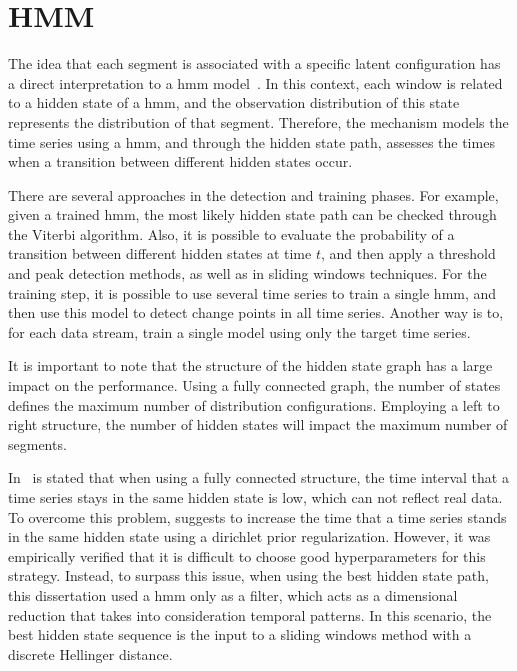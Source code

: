 \section{HMM}

The idea that each segment is associated with a specific latent configuration
has a direct interpretation to a \gls*{hmm}
model~\cite{a_hidden_markov_model_segmentation_procedure_for_hydrological_and_environmental_time_series, fast_estimation_of_posterior_probabilities_in_change-point_analysis_through_a_constrained_hidden_markov_model, inertial_hidden_markov_models_modeling_change_in_multivariate_time_series}.
In this context, each window is related to a hidden state of a \gls*{hmm}, and the
observation distribution of this state represents the distribution of that
segment. Therefore, the mechanism models the time series using a \gls*{hmm}, and
through the hidden state path, assesses the times when a transition between
different hidden states occur.

There are several approaches in the detection and training phases. For example,
given a trained \gls*{hmm}, the most likely hidden state path can be checked
through
the Viterbi algorithm. Also, it is possible to evaluate the probability of a
transition between different hidden states at time $t$, and then apply a
threshold and peak detection methods, as well as in sliding windows techniques.
For the training step, it is possible to use several time series to train a
single \gls*{hmm}, and then use this model to detect change points in all time series.
Another way is to, for each data stream, train a single model using only the
target time series.

It is important to note that the structure of the hidden state graph has a large
impact on the performance. Using a fully connected graph, the number of states
defines the maximum number of distribution configurations. Employing a left to
right structure, the number of hidden states will impact the maximum number of
segments.

In~\cite{inertial_hidden_markov_models_modeling_change_in_multivariate_time_series}
is stated that when using a fully connected structure, the time interval that a
time series stays in the same hidden state is low, which can not reflect real
data. To overcome this problem,
\cite{inertial_hidden_markov_models_modeling_change_in_multivariate_time_series}
suggests to increase the time that a time series stands in the same hidden
state using a dirichlet prior regularization. However, it was empirically
verified that it is difficult to choose good hyperparameters for this strategy.
Instead, to surpass this issue,
when using the best hidden state path, this dissertation used a \gls*{hmm} only as a
filter, which acts as a dimensional reduction that takes into consideration
temporal
patterns. In this scenario, the best hidden state sequence is the input to
a sliding windows method with a discrete Hellinger distance.

